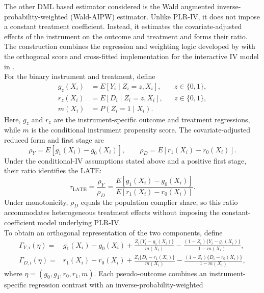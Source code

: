 \documentclass[12pt, a4paper, oneside]{article}
\theoremstyle{plain}
\theoremstyle{definition}
\begin{document}
The other DML based estimator considered is the Wald augmented inverse-probability-weighted
(Wald-AIPW) estimator. Unlike PLR-IV, it does not impose a constant treatment
coefficient. Instead, it estimates the covariate-adjusted effects of the
instrument on the outcome and treatment and forms their ratio. The construction
combines the regression and weighting logic developed by
\citet{tan2006regression} with the orthogonal score and cross-fitted
implementation for the interactive IV model in
\citet[Section~5.2]{chernozhukov2018double}.\\
For the binary instrument and treatment, define
\begin{align}
    g_z(X_i)
    &=
    E[Y_i\mid Z_i=z,X_i],
    && z\in\{0,1\},\\
    r_z(X_i)
    &=
    E[D_i\mid Z_i=z,X_i],
    && z\in\{0,1\},\\
    m(X_i)
    &=
    P(Z_i=1\mid X_i).
    \label{eq:wald_nuisances}
\end{align}
Here, \(g_z\) and \(r_z\) are the instrument-specific outcome and treatment
regressions, while \(m\) is the conditional instrument propensity score. The
covariate-adjusted reduced form and first stage are
\[
    \rho_Y=E[g_1(X_i)-g_0(X_i)],
    \qquad
    \rho_D=E[r_1(X_i)-r_0(X_i)].
\]
Under the conditional-IV assumptions stated above and a positive first stage,
their ratio identifies the LATE:
\begin{equation}
    \tau_{\mathrm{LATE}}
    =
    \frac{\rho_Y}{\rho_D}
    =
    \frac{E[g_1(X_i)-g_0(X_i)]}
         {E[r_1(X_i)-r_0(X_i)]}.
    \label{eq:wald_late_ratio}
\end{equation}
Under monotonicity, \(\rho_D\) equals the population complier share, so this
ratio accommodates heterogeneous treatment effects without imposing the
constant-coefficient model underlying PLR-IV.\\
To obtain an orthogonal representation of the two components, define
\begin{align}
    \Gamma_{Y,i}(\eta)
    ={}&
    g_1(X_i)-g_0(X_i)
    +\frac{Z_i\{Y_i-g_1(X_i)\}}{m(X_i)}
    -\frac{(1-Z_i)\{Y_i-g_0(X_i)\}}{1-m(X_i)},
    \label{eq:wald_gamma_y}\\
    \Gamma_{D,i}(\eta)
    ={}&
    r_1(X_i)-r_0(X_i)
    +\frac{Z_i\{D_i-r_1(X_i)\}}{m(X_i)}
    -\frac{(1-Z_i)\{D_i-r_0(X_i)\}}{1-m(X_i)},
    \label{eq:wald_gamma_d}
\end{align}
where \(\eta=(g_0,g_1,r_0,r_1,m)\). Each pseudo-outcome combines an
instrument-specific regression contrast with an inverse-probability-weighted
\end{document}
